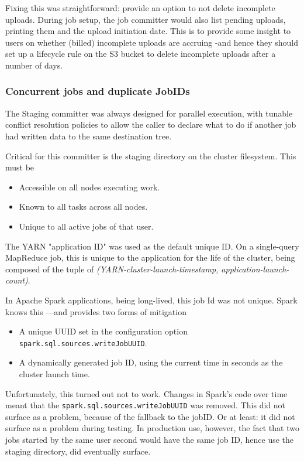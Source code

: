 \documentclass[conference]{IEEEtran}
\begin{document}
Fixing this was straightforward: provide an option to not delete incomplete
uploads.
During job setup, the job committer would also list pending
uploads, printing them and the upload initiation date.
This is to provide some insight to users on whether (billed) incomplete uploads
are accruing -and hence they should set up a lifecycle rule on the S3 bucket
to delete incomplete uploads after a number of days.

\subsubsection{Concurrent jobs and duplicate JobIDs}

The Staging committer was always designed for parallel execution,
with tunable conflict resolution policies to allow the caller to
declare what to do if another job had written data to the same
destination tree.

Critical for this committer is the staging directory on the cluster filesystem.
This must be

\begin{itemize}
    \item Accessible on all nodes executing work.
    \item Known to all tasks across all nodes.
    \item Unique to all active jobs of that user.
\end{itemize}

The YARN "application ID" was used as the default unique ID.
On a single-query MapReduce job, this is unique to the application
for the life of the cluster, being composed of the tuple of
\emph{(YARN-cluster-launch-timestamp, application-launch-count)}.

In Apache Spark applications, being long-lived, this job Id was not unique.
Spark knows this ---and provides two forms of mitigation
\begin{itemize}
    \item A unique UUID set in the configuration option \texttt{spark.sql.sources.writeJobUUID}.
    \item A dynamically generated job ID, using the current time in seconds as the cluster launch time.
\end{itemize}

Unfortunately, this turned out not to work.
Changes in Spark's code over
time meant that the \texttt{spark.sql.sources.writeJobUUID} was removed.
This did not surface as a problem, because of the fallback to the jobID.
Or at least: it did not surface as a problem during testing.
In production use, however, the fact that two jobs started by the same user
second would have the same job ID, hence use the staging directory,
did eventually surface.
\end{document}
